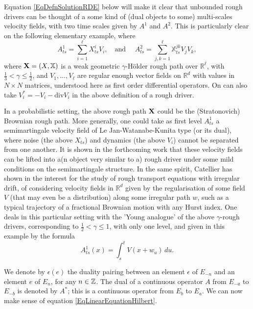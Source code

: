 \documentclass[11pt,a4paper]{amsart}
\newcommand{\RR}{\mathbb{R}}  \newcommand{\CC}{\mathbb{C}}  \newcommand{\LL}{\mathbb{L}}  \newcommand{\WW}{\mathbb{W}}
\newcommand{\bbX}{\mathbb{X}}
\newcommand{\ep}{\epsilon}
\renewcommand{\leq}{\leqslant}
\theoremstyle{plain}%
\theoremstyle{definition}
\theoremstyle{remark}
\numberwithin{equation}{section} %
\begin{document}
\medskip

Equation \eqref{EqDefnSolutionRDE} below will make it clear that unbounded rough drivers can be thought of a some kind of (dual objects to some) multi-scales velocity fields, with two time scales given by $A^1$ and $A^2$. This is particularly clear on the following elementary example, where
$$
A^1_{ts} = \sum_{i=1}^\ell X^i_{ts}V_i, \quad \textrm{and } \quad A^2_{ts} = \sum_{j,k=1}^\ell \bbX^{jk}_{ts}V_jV_k,
$$
where ${\bfX} = (X,\bbX)$ is a weak geometric $\gamma$-H\"older rough path over $\RR^\ell$, with $\frac{1}{3}<\gamma\leq \frac{1}{2}$, and $V_1,\dots, V_\ell$ are regular enough vector fields on $\RR^d$ with values in $N\times N$ matrices, understood here as first order differential operators. On can also take $V_i^* = -V_i - \textrm{div}V_i$ in the above definition of a rough driver.

\smallskip

In a probabilistic setting, the above rough path ${\bf X}$ could be the (Stratonovich) Brownian rough path. More generally, one could take as first level $A^1_{ts}$ a semimartingale velocity field of Le Jan-Watanabe-Kunita type (or its dual), where noise (the above $X_{ts}$) and dynamics (the above $V_i$) cannot be separated from one another. It is shown in the forthcoming work \cite{BailleulRiedel} that these velocity fields can be lifted into a(n object very similar to a) rough driver under some mild conditions on the semimartingale structure. In the same spirit, Catellier has shown in \cite{Catellierregularisation, CatellierTransport} the interest for the study of rough transport equations with irregular drift, of considering velocity fields in $\RR^d$ given by the regularisation of some field $V$ (that may even be a distribution) along some irregular path $w$, such as a typical trajectory of a fractional Brownian motion with any Hurst index. One deals in this particular setting with the 'Young analogue' of the above $\gamma$-rough drivers, corresponding to $\frac{1}{2}<\gamma\leq 1$, with only one level, and given in this example by the formula
$$
A^1_{ts}(x) = \int_s^t V(x+w_u)\,du.
$$

\medskip

We denote by $\ep(e)$ the duality pairing between an element $\ep$ of $E_{-n}$ and an element $e$ of $E_n$, for any $n\in\mathbb{Z}$. The dual of a continuous operator $A$ from $E_{-a}$ to $E_{-b}$ is denoted by $A^*$; this is a continuous operator from $E_b$ to $E_a$. We can now make sense of equation \eqref{EqLinearEquationHilbert}. 
\end{document}
